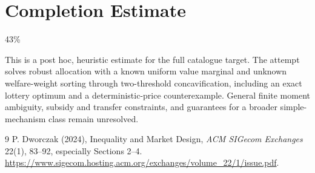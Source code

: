 \documentclass[11pt]{article}
\theoremstyle{remark}\newtheorem{remark}[theorem]{Remark}
\begin{document}
\section{Completion Estimate}
43\%

This is a post hoc, heuristic estimate for the full catalogue target.
The attempt solves robust allocation with a known uniform value marginal and unknown welfare-weight sorting through two-threshold concavification, including an exact lottery optimum and a deterministic-price counterexample. General finite moment ambiguity, subsidy and transfer constraints, and guarantees for a broader simple-mechanism class remain unresolved.

\begin{thebibliography}{9}
 P. Dworczak (2024), Inequality and Market Design, \emph{ACM SIGecom Exchanges} 22(1), 83--92, especially Sections 2--4. \url{https://www.sigecom.hosting.acm.org/exchanges/volume_22/1/issue.pdf}.
\end{thebibliography}
\end{document}
